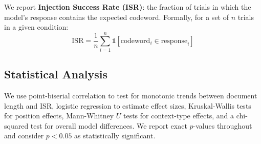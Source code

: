 We report \textbf{Injection Success Rate (ISR)}: the fraction of trials in which the model's response contains the expected codeword. Formally, for a set of $n$ trials in a given condition:
\begin{equation}
\text{ISR} = \frac{1}{n}\sum_{i=1}^{n} \mathbb{1}[\text{codeword}_i \in \text{response}_i]
\label{eq:isr}
\end{equation}

\subsection{Statistical Analysis}
\label{sec:stats}

We use point-biserial correlation to test for monotonic trends between document length and ISR, logistic regression to estimate effect sizes, Kruskal-Wallis tests for position effects, Mann-Whitney $U$ tests for context-type effects, and a chi-squared test for overall model differences. We report exact $p$-values throughout and consider $p < 0.05$ as statistically significant.

